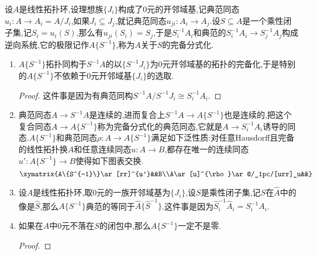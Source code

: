 设$A$是线性拓扑环,设理想族$\{J_i\}$构成了0元的开邻域基,记典范同态$u_i:A\to A_i=A/J_i$,如果$J_i\subseteq J_j$,就记典范同态$u_{ji}:A_i\to A_j$.设$S\subseteq A$是一个乘性闭子集,记$S_i=u_i(S)$,那么有$u_{ji}(S_i)=S_j$,于是$S_i^{-1}A_i$和典范的$S_i^{-1}A_i\to S_j^{-1}A_j$构成逆向系统,它的极限记作$A\{S^{-1}\}$,称为$A$关于$S$的完备分式化.
\begin{enumerate}
	\item $A\{S^{-1}\}$拓扑同构于$S^{-1}A$的以$\{S^{-1}J_i\}$为0元开邻域基的拓扑的完备化,于是特别的$A\{S^{-1}\}$不依赖于0元开邻域基$\{J_i\}$的选取.
	\begin{proof}
		
		这件事是因为有典范同构$S^{-1}A/S^{-1}J_i\cong S_i^{-1}A_i$.
	\end{proof}
    \item 典范同态$A\to S^{-1}A$是连续的,进而复合上$S^{-1}A\to A\{S^{-1}\}$也是连续的,把这个复合同态$A\to A\{S^{-1}\}$称为完备分式化的典范同态,它就是$A\to S_i^{-1}A_i$诱导的同态.$A\{S^{-1}\}$和典范同态$\rho:A\to A\{S^{-1}\}$满足如下泛性质:对任意Hausdorff且完备的线性拓扑换$A$和任意连续同态$u:A\to B$,都存在唯一的连续同态$u':A\{S^{-1}\}\to B$使得如下图表交换.
    $$\xymatrix{A\{S^{-1}\}\ar[rr]^{u'}&&B\\A\ar[u]^{\rho}\ar@/_1pc/[urr]_u&&}$$
    \item 设$A$是线性拓扑环,取0元的一族开邻域基为$\{J_i\}$,设$S$是乘性闭子集,记$S$在$\widehat{A}$中的像是$\widehat{S}$,那么$A\{S^{-1}\}$典范的等同于$\widehat{A}\{\widehat{S}^{-1}\}$.这件事是因为$\widehat{S}_i^{-1}\widehat{A}_i=S_i^{-1}A_i$.
    \item 如果在$A$中0元不落在$S$的闭包中,那么$A\{S^{-1}\}$一定不是零.
    \begin{proof}
    	

\end{proof}
\end{enumerate}
